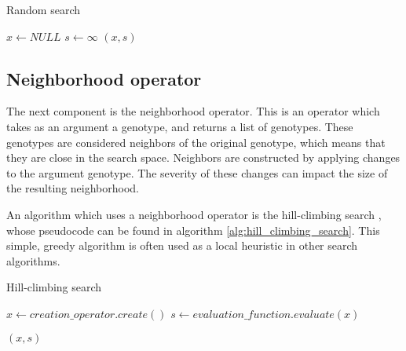\begin{algorithm}[!htbp]
    \caption{Random search}
    \label{alg:random_search}

    $x \gets NULL$\;
    $s \gets \infty$\;
    \Return $(x, s)$\;
    \end{algorithm}
    
\subsection{Neighborhood operator}
\label{sec:neighbood_operator}

The next component is the neighborhood operator. This is an operator which takes as an argument a genotype, and returns a list of genotypes. These genotypes are considered neighbors of the original genotype, which means that they are close in the search space. Neighbors are constructed by applying changes to the argument genotype. The severity of these changes can impact the size of the resulting neighborhood.

An algorithm which uses a neighborhood operator is the hill-climbing search \citep{artificial_intelligence}, whose pseudocode can be found in algorithm \ref{alg:hill_climbing_search}. This simple, greedy algorithm is often used as a local heuristic in other search algorithms.

\begin{algorithm}[!htbp]
    \caption{Hill-climbing search}
    \label{alg:hill_climbing_search}

    $x \gets creation\_operator.create()$\;
    $s \gets evaluation\_function.evaluate(x)$\;


    \Return $(x, s)$\;
    \end{algorithm}


